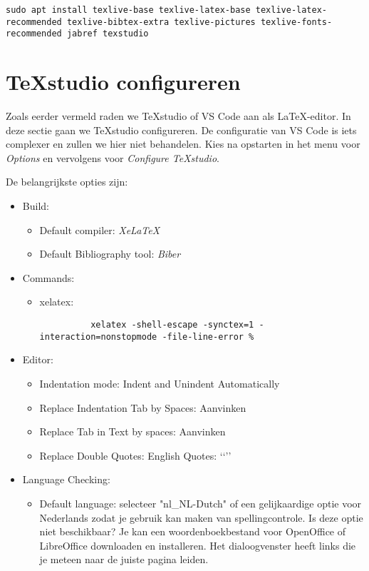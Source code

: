 \begin{verbatim}
sudo apt install texlive-base texlive-latex-base texlive-latex-recommended texlive-bibtex-extra texlive-pictures texlive-fonts-recommended jabref texstudio
\end{verbatim}


\section{{\TeX}studio configureren}%
\label{sec:texstudio-configureren}

Zoals eerder vermeld raden we {\TeX}studio of VS Code aan als {\LaTeX}-editor. In deze sectie gaan we {\TeX}studio configureren. De configuratie van VS Code is iets complexer en zullen we hier niet behandelen. Kies na opstarten in het menu voor \textit{Options} en vervolgens voor \textit{Configure {\TeX}studio}.

De belangrijkste opties zijn:

\begin{itemize}
  \item Build:
    \begin{itemize}
      \item Default compiler: \textit{XeLaTeX}
      \item Default Bibliography tool: \textit{Biber}
    \end{itemize}
  \item Commands:
    \begin{itemize}
      \item xelatex:
      
        \begin{verbatim}
          xelatex -shell-escape -synctex=1 -interaction=nonstopmode -file-line-error %
        \end{verbatim}

    \end{itemize}
  \item Editor:
    \begin{itemize}
      \item Indentation mode: Indent and Unindent Automatically
      \item Replace Indentation Tab by Spaces: Aanvinken
      \item Replace Tab in Text by spaces: Aanvinken
      \item Replace Double Quotes: English Quotes: ‘‘’’
    \end{itemize}
  \item Language Checking:
    \begin{itemize}
      \item Default language: selecteer "nl\_NL-Dutch" of een gelijkaardige optie voor Nederlands zodat je gebruik kan maken van spellingcontrole. Is deze optie niet beschikbaar? Je kan een woordenboekbestand voor OpenOffice of LibreOffice downloaden en installeren. Het dialoogvenster heeft links die je meteen naar de juiste pagina leiden.
    \end{itemize}
\end{itemize}


